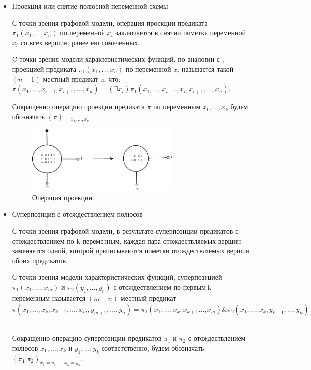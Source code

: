 \documentclass[12pt]{article}
\begin{document}
\label{operations}
\begin{itemize}
    \item Проекция или снятие полюсной переменной схемы
    
    С точки зрения графовой модели, операция проекции предиката $\pi_1(x_1, \dots, x_n)$ по переменной $x_i$
    заключается в снятии пометки переменной $x_i$ со всех вершин, ранее ею помеченных.

    C точки зрения модели характеристических функций,
    по аналогии с \cite{Marchenkov}, проекцией предиката $\pi_1(x_1, \dots, x_n)$ по переменной $x_i$ называется такой
    $(n-1)$-местный предикат $\pi$, что:
    $\pi(x_1, \dots, x_{i-1}, x_{i+1}, \dots, x_n) = (\exists x_i) \pi_1(x_1, \dots, x_{i-1}, x_i, x_{i+1}, \dots, x_n)$.

    Сокращенно операцию проекции предиката $\pi$ по переменным $x_1, \dots, x_k$ 
    будем обозначать $(\pi)\perp_{x_1, \dots, x_k}$

    \begin{figure}[htb]
    \centering
    \includegraphics[width=0.7\textwidth]{project_op.png}
    \caption{Операция проекции}
    \label{fig:project_op}
    \end{figure}

    \samepage
    \item Суперпозиция с отождествлением полюсов

    С точки зрения графовой модели, в результате суперпозиции предикатов с отождествлением по k переменным, каждая пара
    отождествляемых вершин заменяется одной, которой приписываются пометки отождествляемых вершин обоих предикатов.

    С точки зрения модели характеристических функций, 
    суперпозицией $\pi_1(x_1, \dots, x_m)$ и $\pi_2(y_1, \dots, y_n)$ с отождествлением по первым k переменным 
    называется $(m+n)$-местный предикат
    $\pi(x_1, \dots, x_k, x_{k+1}, \dots, x_m, y_{m+1}, \dots, y_n) = \pi_1(x_1, \dots, x_k, x_{k+1} \dots, x_m) \& \pi_2(x_1, \dots, x_k, y_{k+1}, \dots, y_n)$.

    Сокращенно операцию суперпозиции предикатов $\pi_1$ и $\pi_2$ с отождествлением полюсов 
    $x_1, \dots, x_k$ и $y_1, \dots, y_k$ соответственно, будем обозначать $(\pi_1|\pi_2)_{x_1=y_1, \dots, x_k=y_k}$.


\end{itemize}
\end{document}
